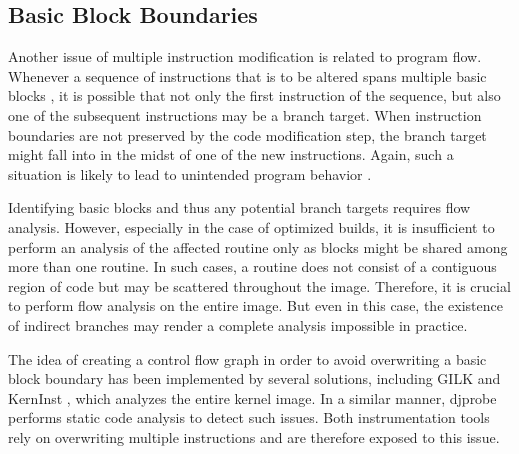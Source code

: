 

	  


\subsection{Basic Block Boundaries}
\label{sec:BasicBlockBoundaries}
Another issue of multiple instruction modification is related to program flow. 
Whenever a sequence of instructions that is to be altered spans multiple 
basic blocks \cite{Aho88}, it is possible that not only the first instruction of the sequence,
but also one of the subsequent instructions may be a branch target.
When instruction boundaries are not preserved by the code modification step,
the branch target might fall into in the midst of one of the new instructions.
Again, such a situation is likely to lead to unintended program behavior 
\cite{tamches99finegrained}.

Identifying basic blocks and thus any potential branch targets requires flow
analysis. However, especially in the case of optimized builds, it is insufficient
to perform an analysis of the affected routine only as blocks might be shared
among more than one routine. In such cases, a routine does not consist of a contiguous
region of code but may be scattered throughout the image. Therefore, it is crucial
to perform flow analysis on the entire image. But even in this case, the existence of 
indirect branches may render a complete analysis impossible in practice. 

The idea of creating a control flow graph in order to avoid overwriting a 
basic block boundary has been implemented by several solutions, including
GILK \cite{Pearce00} and KernInst \cite{Tamches01}, which analyzes the entire kernel image. 
In a similar manner, djprobe \cite{Hiramatsu07} 
performs static code analysis to detect such issues. Both 
instrumentation tools rely on overwriting multiple instructions and are
therefore exposed to this issue.

